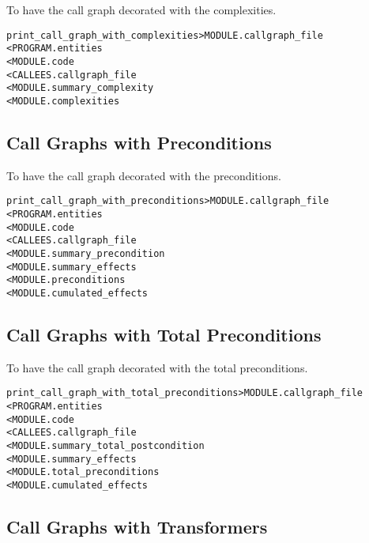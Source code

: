 \documentclass[a4paper]{report}
\newenvironment{PipsMake}{\begin{alltt}}{\end{alltt}}
\newenvironment{PipsPass}[1]{\label{pass:#1}}{}
\begin{document}
\begin{PipsPass}{print_call_graph_with_complexities}
To have the call graph decorated with the complexities.
\end{PipsPass}
\begin{PipsMake}
print_call_graph_with_complexities     > MODULE.callgraph_file
        < PROGRAM.entities
        < MODULE.code
        < CALLEES.callgraph_file
        < MODULE.summary_complexity
        < MODULE.complexities
\end{PipsMake}

\subsection{Call Graphs with Preconditions}

\begin{PipsPass}{print_call_graph_with_preconditions}
To have the call graph decorated with the preconditions.
\end{PipsPass}
\begin{PipsMake}
print_call_graph_with_preconditions      > MODULE.callgraph_file
        < PROGRAM.entities
        < MODULE.code
        < CALLEES.callgraph_file
        < MODULE.summary_precondition
        < MODULE.summary_effects
        < MODULE.preconditions
        < MODULE.cumulated_effects
\end{PipsMake}

\subsection{Call Graphs with Total Preconditions}

\begin{PipsPass}{print_call_graph_with_total_preconditions}
To have the call graph decorated with the total preconditions.
\end{PipsPass}
\begin{PipsMake}
print_call_graph_with_total_preconditions      > MODULE.callgraph_file
        < PROGRAM.entities
        < MODULE.code
        < CALLEES.callgraph_file
        < MODULE.summary_total_postcondition
        < MODULE.summary_effects
        < MODULE.total_preconditions
        < MODULE.cumulated_effects
\end{PipsMake}

\subsection{Call Graphs with Transformers}
\end{document}
